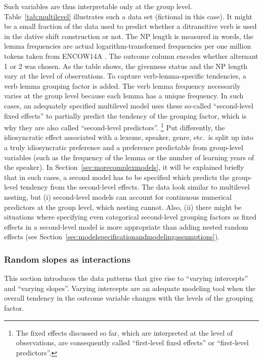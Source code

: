 Such variables are thus interpretable only at the group level.
Table~\ref{tab:multilevel} illustrates such a data set (fictional in this case).
It might be a small fraction of the data used to predict whether a ditransitive verb is used in the dative shift construction or not.
The NP length is measured in words, the lemma frequencies are actual logarithm-transformed frequencies per one million tokens taken from ENCOW14A \citep{SchaeferBildhauer2012}.
The outcome column encodes whether alternant 1 or 2 was chosen.
As the table shows, the givenness status and the NP length vary at the level of observations.
To capture verb-lemma-specific tendencies, a verb lemma grouping factor is added.
The verb lemma frequency necessarily varies at the group level because each lemma has a unique frequency.
In such cases, an adequately specified multilevel model uses these so-called ``second-level fixed effects'' to partially predict the tendency of the grouping factor, which is why they are also called ``second-level predictors''.%
\footnote{The fixed effects discussed so far, which are interpreted at the level of observations, are consequently called ``first-level fixed effects'' or ``first-level predictors''.}
Put differently, the idiosyncratic effect associated with a lexeme, speaker, genre, etc.\ is split up into a truly idiosyncratic preference and a preference predictable from group-level variables (such as the frequency of the lemma or the number of learning years of the speaker).
In Section~\ref{sec:morecomplexmodels}, it will be explained briefly that in such cases, a second model has to be specified which predicts the group-level tendency from the second-level effects.
The data look similar to multilevel nesting, but (i) second-level models can account for continuous numerical predictors at the group level, which nesting cannot.
Also, (ii) there might be situations where specifying even categorical second-level grouping factors as fixed effects in a second-level model is more appropriate than adding nested random effects (see Section~\ref{sec:modelspecificationandmodelingassumptions}).


\subsubsection{Random slopes as interactions}
\label{sec:randominterceptsandslopes}

This section introduces the data patterns that give rise to ``varying intercepts'' and ``varying slopes''. 
Varying intercepts are an adequate modeling tool when the overall tendency in the outcome variable changes with the levels of the grouping factor.

